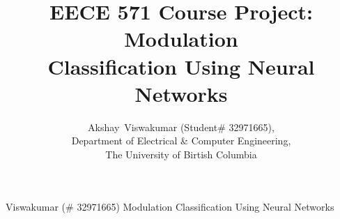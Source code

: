 \documentclass[12pt,journal,onecolumn,twoside]{IEEEtran}
\begin{document}
%
\title{EECE 571 Course Project: Modulation\\ Classification Using Neural Networks}
%
%
%

\author{Akshay~Viswakumar (Student\# 32971665), \\Department of Electrical \& Computer Engineering, \\The University of Birtish Columbia
}

% 
%

%
{Viswakumar (\# 32971665) \: Modulation Classification Using Neural Networks}
% 
\end{document}
